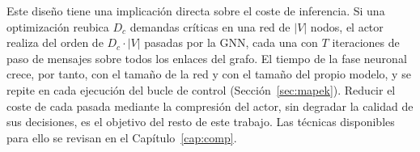 Este diseño tiene una implicación directa sobre el coste de inferencia. Si una optimización reubica $D_c$ demandas críticas en una red de $|V|$ nodos, el actor realiza del orden de $D_c \cdot |V|$ pasadas por la GNN, cada una con $T$ iteraciones de paso de mensajes sobre todos los enlaces del grafo. El tiempo de la fase neuronal crece, por tanto, con el tamaño de la red y con el tamaño del propio modelo, y se repite en cada ejecución del bucle de control (Sección~\ref{sec:mapek}). Reducir el coste de cada pasada mediante la compresión del actor, sin degradar la calidad de sus decisiones, es el objetivo del resto de este trabajo. Las técnicas disponibles para ello se revisan en el Capítulo~\ref{cap:comp}.
